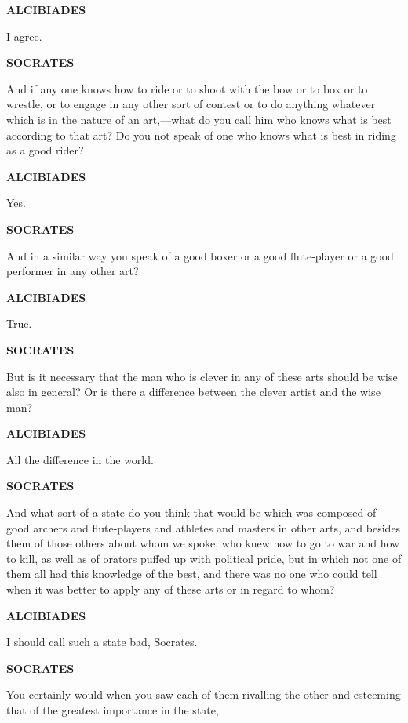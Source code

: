 \documentclass[11pt,letter]{article}
\begin{document}
\par \textbf{ALCIBIADES}
\par   I agree.

\par \textbf{SOCRATES}
\par   And if any one knows how to ride or to shoot with the bow or to box or to wrestle, or to engage in any other sort of contest or to do anything whatever which is in the nature of an art,—what do you call him who knows what is best according to that art? Do you not speak of one who knows what is best in riding as a good rider?

\par \textbf{ALCIBIADES}
\par   Yes.

\par \textbf{SOCRATES}
\par   And in a similar way you speak of a good boxer or a good flute-player or a good performer in any other art?

\par \textbf{ALCIBIADES}
\par   True.

\par \textbf{SOCRATES}
\par   But is it necessary that the man who is clever in any of these arts should be wise also in general? Or is there a difference between the clever artist and the wise man?

\par \textbf{ALCIBIADES}
\par   All the difference in the world.

\par \textbf{SOCRATES}
\par   And what sort of a state do you think that would be which was composed of good archers and flute-players and athletes and masters in other arts, and besides them of those others about whom we spoke, who knew how to go to war and how to kill, as well as of orators puffed up with political pride, but in which not one of them all had this knowledge of the best, and there was no one who could tell when it was better to apply any of these arts or in regard to whom?

\par \textbf{ALCIBIADES}
\par   I should call such a state bad, Socrates.

\par \textbf{SOCRATES}
\par   You certainly would when you saw each of them rivalling the other and esteeming that of the greatest importance in the state,
\end{document}
